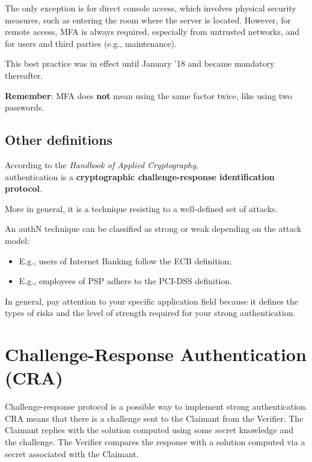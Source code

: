 The only exception is for direct console access, which involves physical security measures, such as entering the room where the server is located. However, for remote access, MFA is always required, especially from untrusted networks, and for users and third parties (e.g., maintenance).

This best practice was in effect until January '18 and became mandatory thereafter.

\textbf{Remember}: MFA does \textbf{not} mean using the same factor twice, like using two passwords.



\subsection{Other definitions}
According to the \textit{Handbook of Applied Cryptography},\\
authentication is a \textbf{cryptographic challenge-response identification protocol}.

More in general, it is a technique resisting to a well-defined set of attacks.

An authN technique can be classified as strong or weak depending on the attack model:
\begin{itemize}
  \item E.g., users of Internet Banking follow the ECB definition;
  \item E.g., employees of PSP adhere to the PCI-DSS definition.
\end{itemize}

In general, pay attention to your specific application field because it defines the types of risks and the level of strength required for your strong authentication.




\section{Challenge-Response Authentication (CRA)}
Challenge-response protocol is a possible way to implement strong authentication. CRA means that there is a
challenge sent to the Claimant from the Verifier. The Claimant replies with the solution computed using some
secret knowledge and the challenge. The Verifier compares the response with a solution computed via a secret
associated with the Claimant.



